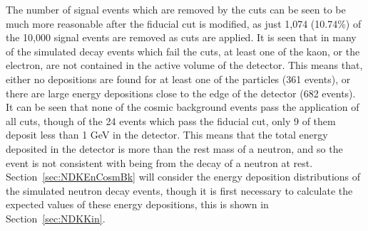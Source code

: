 The number of signal events which are removed by the cuts can be seen to be much more reasonable after the fiducial cut is modified, as just 1,074 (10.74\%) of the 10,000 signal events are removed as cuts are applied. It is seen that in many of the simulated decay events which fail the cuts, at least one of the kaon, or the electron, are not contained in the active volume of the detector. This means that, either no depositions are found for at least one of the particles (361 events), or there are large energy depositions close to the edge of the detector (682 events). \\

It can be seen that none of the cosmic background events pass the application of all cuts, though of the 24 events which pass the fiducial cut, only 9 of them deposit less than 1 GeV in the detector. This means that the total energy deposited in the detector is more than the rest mass of a neutron, and so the event is not consistent with being from the decay of a neutron at rest. Section~\ref{sec:NDKEnCosmBk} will consider the energy deposition distributions of the simulated neutron decay events, though it is first necessary to calculate the expected values of these energy depositions, this is shown in Section~\ref{sec:NDKKin}. \\

